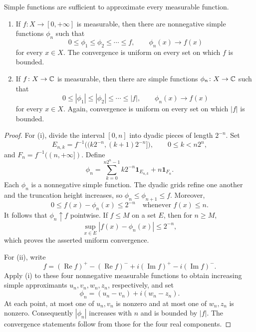 Simple functions are sufficient to approximate every measurable
function.

\begin{theorem}
  \label{thm:simple-approximation-sep-17}
  \begin{enumerate}[label=(\roman*)]
    \item If $f\colon X\to[0,+\infty]$ is measurable, then there are
      nonnegative simple functions $\phi_n$ such that
      \[
        0\leq\phi_1\leq\phi_2\leq\cdots\leq f,
        \qquad
        \phi_n(x)\longrightarrow f(x)
      \]
      for every $x\in X$.  The convergence is uniform on every set on
      which $f$ is bounded.
    \item If $f\colon X\to\mathbb{C}$ is measurable, then there are simple
      functions $\phi_n\colon X\to\mathbb{C}$ such that
      \[
        0\leq|\phi_1|\leq|\phi_2|\leq\cdots\leq|f|,
        \qquad
        \phi_n(x)\longrightarrow f(x)
      \]
      for every $x\in X$.  Again, convergence is uniform on every set
      on which $|f|$ is bounded.
  \end{enumerate}
\end{theorem}

\begin{proof}
  For (i), divide the interval $[0,n]$ into dyadic pieces of length
  $2^{-n}$.  Set
  \[
    E_{n,k}
      =f^{-1}\bigl((k2^{-n},(k+1)2^{-n}]\bigr),
      \qquad 0\leq k<n2^n,
  \]
  and $F_n=f^{-1}((n,+\infty])$.  Define
  \begin{equation}\label{eq:dyadic-simple-approximation-sep-17}
    \phi_n
      =\sum_{k=0}^{n2^n-1}k2^{-n}\mathbf 1_{E_{n,k}}
       +n\mathbf 1_{F_n}.
  \end{equation}
  Each $\phi_n$ is a nonnegative simple function.  The dyadic grids
  refine one another and the truncation height increases, so
  $\phi_n\leq\phi_{n+1}\leq f$.  Moreover,
  \[
    0\leq f(x)-\phi_n(x)\leq2^{-n}
    \quad\text{whenever }f(x)\leq n.
  \]
  It follows that $\phi_n\uparrow f$ pointwise.  If $f\leq M$ on a set
  $E$, then for $n\geq M$,
  \[
    \sup_{x\in E}|f(x)-\phi_n(x)|\leq2^{-n},
  \]
  which proves the asserted uniform convergence.

  For (ii), write
  \[
    f=(\operatorname{Re}f)^+-(\operatorname{Re}f)^-
      +i(\operatorname{Im}f)^+-i(\operatorname{Im}f)^-.
  \]
  Apply (i) to these four nonnegative measurable functions to obtain
  increasing simple approximants $u_n,v_n,w_n,z_n$, respectively, and
  set
  \[
    \phi_n=(u_n-v_n)+i(w_n-z_n).
  \]
  At each point, at most one of $u_n,v_n$ is nonzero and at most one of
  $w_n,z_n$ is nonzero.  Consequently $|\phi_n|$ increases with $n$ and
  is bounded by $|f|$.  The convergence statements follow from those
  for the four real components.
\end{proof}

